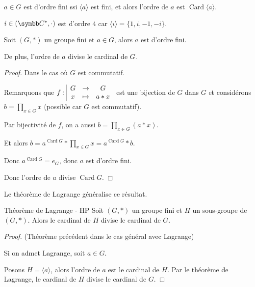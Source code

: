 \begin{corollaire}{}{}
    $a \in G$ est d'ordre fini ssi $\langle a \rangle$ est fini, et alors l'ordre de 
    $a$ est $\operatorname{Card} \langle a \rangle$.
\end{corollaire}

\begin{exemple}
    $i \in (\C^*, \cdot)$ est d'ordre $4$ car
    $\langle i \rangle = \{1, i, -1, -i\}$.
\end{exemple}

\begin{theoreme}{}{}
    Soit $(G, \ast)$ un groupe fini et $a \in G$, 
    alors $a$ est d'ordre fini. 

    De plus, l'ordre de $a$ divise le cardinal de $G$.
\end{theoreme}


\begin{proof}
    Dans le cas où $G$ est commutatif. 

    Remarquons que $f: \space \begin{array}{|ccc} \displaystyle G & \to & \displaystyle G \\ \displaystyle x & \mapsto & \displaystyle a \ast x \end{array}$ est une bijection de $G$ dans $G$
    et considérons $\displaystyle b = \prod_{x \in G} x$ (possible car $G$ est commutatif).

    Par bijectivité de $f$, on a aussi $\displaystyle b = \prod_{x \in G} (a \ast x)$.

    Et alors $\displaystyle b = a^{\operatorname{Card} G} \ast \prod_{x \in G} x = a^{\operatorname{Card} G} \ast b$.

    Donc $a^{\operatorname{Card} G} = e_G$, donc $a$ est d'ordre fini.

    Donc l'ordre de $a$ divise $\operatorname{Card} G$.
\end{proof}

Le théorème de Lagrange généralise ce résultat.

\begin{theoreme}{Théorème de Lagrange - HP}{}
    Soit $(G, \ast)$ un groupe fini et $H$ un sous-groupe de $(G, \ast)$.
    Alors le cardinal de $H$ divise le cardinal de $G$.
\end{theoreme}

\begin{proof}(Théorème précédent dans le cas général avec Lagrange)

    Si on admet Lagrange, soit $a \in G$.

    Posons $H = \langle a \rangle$, alors l'ordre de $a$ est le cardinal de $H$.
    Par le théorème de Lagrange, le cardinal de $H$ divise le cardinal de $G$.
\end{proof}

